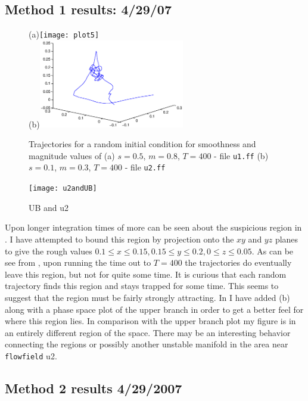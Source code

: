 \documentclass[pre,twocolumn,groupedaddress]{revtex4}
\begin{document}
{\subsection{Method 1 results: 4/29/07}
\begin{figure}[htbp]
  (a)\texttt{[image: plot5]}\\
  (b)\includegraphics[width=2.5in]{plot4}
  \caption{Trajectories for a random initial
  condition for smoothness and magnitude
  values of
    (a) $ s=0.5 $,  $m=0.8$, $T=400$ - file {\tt u1.ff}
    (b) $s=0.1 $, $ m=0.3$, $T=400$ -  file {\tt u2.ff}
          }
          \label{eltonFig:random2}
  \end{figure}
  \begin{figure}[htbp]
  \texttt{[image: u2andUB]}
  \caption{UB and u2}
\label{UBu2}
\end{figure}
Upon longer integration times of  more can
be seen about the suspicious region in .
 I have attempted to bound this region by projection
onto the $xy$ and $yz$ planes to give the rough values $ 0.1 \leq x
\leq 0.15 , 0.15 \leq y \leq 0.2 , 0 \leq z \leq 0.05 $.  As can be
see from , upon running the time out to $T
= 400$ the trajectories do eventually leave this region, but not for
quite some time. It is curious that each random trajectory finds
this region and stays trapped for some time. This seems to suggest
that the region must be fairly strongly attracting. In 
I have added (b) along with a phase space
plot of the upper branch in order to get a better feel for where
this region lies. In comparison with the upper branch plot my figure
is in an entirely different region of the space. There may be an
interesting behavior connecting the regions or possibly another
unstable manifold in the area near {\tt flowfield} u2.

\subsection{Method 2 results 4/29/2007}

}
\end{document}
